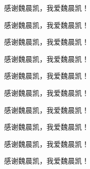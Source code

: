感谢魏晨凯，我爱魏晨凯！

感谢魏晨凯，我爱魏晨凯！

感谢魏晨凯，我爱魏晨凯！

感谢魏晨凯，我爱魏晨凯！

感谢魏晨凯，我爱魏晨凯！

感谢魏晨凯，我爱魏晨凯！

感谢魏晨凯，我爱魏晨凯！

感谢魏晨凯，我爱魏晨凯！

感谢魏晨凯，我爱魏晨凯！

感谢魏晨凯，我爱魏晨凯！